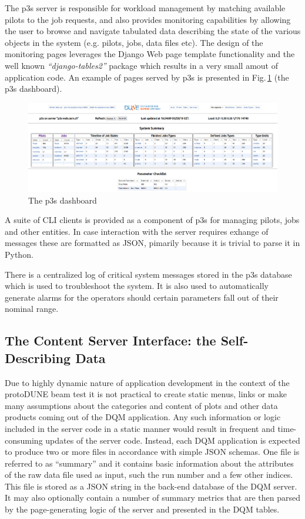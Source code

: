 \documentclass{webofc}
\newcommand{\pd}{protoDUNE\xspace}
\begin{document}
The p3s server is responsible for workload management by matching available pilots to the job requests,
and also provides monitoring capabilities by allowing the user to browse and navigate
tabulated data describing the state of the various objects in the system (e.g. pilots, jobs, data files etc).
The design of the monitoring pages leverages the Django Web page template functionality and
the well known \textit{``django-tables2''} package which results
in a very small amout of application code. An example of pages served by p3s is
presented in Fig.\,\ref{fig:p3s_dash} (the p3s dashboard).

\begin{figure}[tb]
\centering\includegraphics[width=1.0\textwidth]{figures/p3s_dash_2018_v1.png}
\caption{\label{fig:p3s_dash}The p3s dashboard}
\end{figure}

 A suite of CLI clients is provided as a component of p3s for managing pilots, jobs and
other entities. In case interaction with the server requires exhange of messages these are
formatted as JSON, pimarily because it is trivial to parse it in Python.

There is a centralized log of critical system messages stored in the p3s database which
is used to troubleshoot the system. It is also used to automatically generate alarms
for the operators should certain parameters fall out of their nominal range.

\subsection{The Content Server Interface: the Self-Describing Data}
Due to highly dynamic nature of application development in the context of the \pd beam
test it is not practical to create static menus, links or make many assumptions about
the categories and content of plots and other data products coming out of the DQM
application. Any such information or logic included in the server code in a static manner
would result in frequent and time-consuming updates of the server code. Instead,
each DQM application is expected to produce two or more files in accordance
with simple JSON schemas. One file is referred to as ``summary'' and it contains basic
information about the attributes of the raw data file used as input, such the run number
and a few other indices. This file is stored as a JSON string in the back-end database
of the DQM server. It may also optionally contain a number of summary metrics
that are then parsed by the page-generating logic of the server and presented
in the DQM tables.
\end{document}
